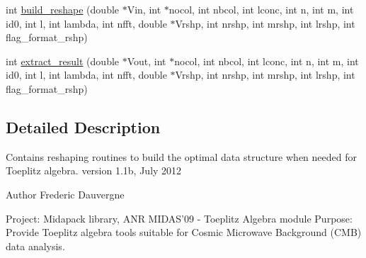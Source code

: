 \begin{DoxyCompactItemize}
\item 
int \hyperlink{toeplitz__rshp_8c_a0a6fdc2b8a9d18173c70ac3f62d3dabd}{build\-\_\-reshape} (double $\ast$Vin, int $\ast$nocol, int nbcol, int lconc, int n, int m, int id0, int l, int lambda, int nfft, double $\ast$Vrshp, int nrshp, int mrshp, int lrshp, int flag\-\_\-format\-\_\-rshp)
\item 
int \hyperlink{toeplitz__rshp_8c_aa006c198e58701067495afeace933382}{extract\-\_\-result} (double $\ast$Vout, int $\ast$nocol, int nbcol, int lconc, int n, int m, int id0, int l, int lambda, int nfft, double $\ast$Vrshp, int nrshp, int mrshp, int lrshp, int flag\-\_\-format\-\_\-rshp)
\end{DoxyCompactItemize}


\subsection{Detailed Description}
Contains reshaping routines to build the optimal data structure when needed for Toeplitz algebra. version 1.\-1b, July 2012 \begin{DoxyAuthor}{Author}
Frederic Dauvergne
\end{DoxyAuthor}
Project\-: Midapack library, A\-N\-R M\-I\-D\-A\-S'09 -\/ Toeplitz Algebra module Purpose\-: Provide Toeplitz algebra tools suitable for Cosmic Microwave Background (C\-M\-B) data analysis.

